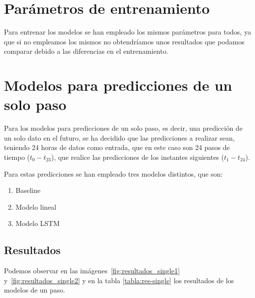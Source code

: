 \section{Parámetros de entrenamiento}

Para entrenar los modelos se han empleado los mismos parámetros para todos, ya que si no empleamos los mismos no obtendríamos unos resultados que podamos comparar debido a las diferencias en el entrenamiento.

\section{Modelos para predicciones de un solo paso}

Para los modelos para predicciones de un solo paso, es decir, una predicción de un solo dato en el futuro, se ha decidido que las predicciones a realizar sean, teniendo 24 horas de datos como entrada, que en este caso son 24 pasos de tiempo ($t_0-t_{23}$), que realice las predicciones de los instantes siguientes ($t_1-t_{24}$).


Para estas predicciones se han empleado tres modelos distintos, que son:

\begin{enumerate}
    \item Baseline
    \item Modelo lineal
    \item Modelo LSTM
\end{enumerate}

\subsection{Resultados}

Podemos observar en las imágenes~\ref{fig:resultados_single1} y~\ref{fig:resultados_single2} y en la tabla \ref{tabla:res-single} los resultados de los modelos de un paso.




